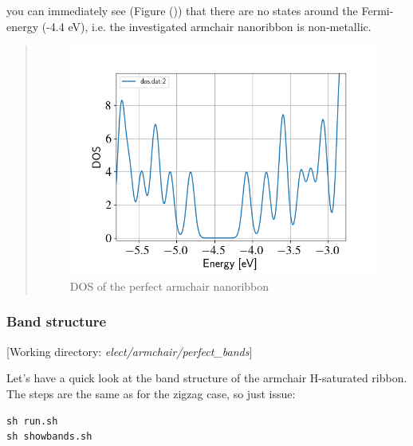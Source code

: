 \documentclass[a4paper,11pt,english]{sphinxmanual}
\begin{document}
{{you can immediately see (Figure {\hyperref[electstruct:fig-armchair-perfect-dos]{\emph{}}} ()) that
there are no states around the Fermi-energy (-4.4 eV), i.e. the
investigated armchair nanoribbon is non-metallic.
\begin{quote}
\begin{figure}[htbp]
\centering
\capstart
\includegraphics[width=0.650\linewidth]{armchair-perfect-dos.png}
\caption{DOS of the perfect armchair nanoribbon}\label{electstruct:fig-armchair-perfect-dos}\end{figure}
\end{quote}


\subsubsection{Band structure}
\label{electstruct:id2}
{[}Working directory: \emph{elect/armchair/perfect\_bands}{]}

Let's have a quick look at the band structure of the armchair
H-saturated ribbon. The steps are the same as for the zigzag case, so
just issue:

\begin{Verbatim}[commandchars=\\\{\}]
sh run.sh
sh showbands.sh
\end{Verbatim}

}}
\end{document}
